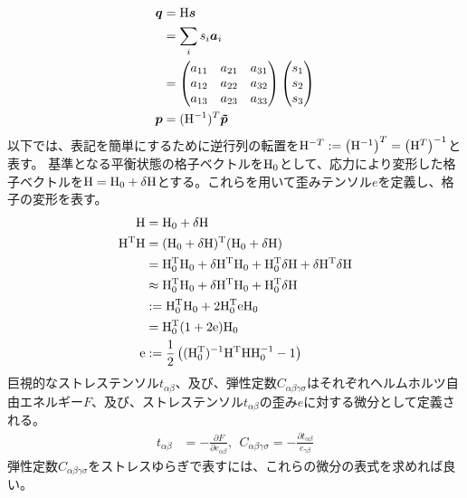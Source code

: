 \documentclass[11pt,a4paper,uplatex]{jsarticle}
\begin{document}
\begin{align}
    \bm{q} &= {\rm H} \bm{s} \\
    &= \sum_{i} s_{i} \bm{a}_{i} \\
    &=          \begin{pmatrix} 
        a_{11} & a_{21} & a_{31} \\
        a_{12} & a_{22} & a_{32} \\
        a_{13} & a_{23} & a_{33} \\
    \end{pmatrix} 
    \begin{pmatrix}
        s_{1} \\ s_{2} \\ s_{3} 
    \end{pmatrix} \\
    \bm{p} &= ({\rm H}^{-1})^{T} \bm{\tilde{p}} 
\end{align}  
以下では、表記を簡単にするために逆行列の転置を${\rm H}^{-T}:=\left({\rm H}^{-1}\right)^{T}=\left({\rm H}^{T}\right)^{-1}$と表す。
基準となる平衡状態の格子ベクトルを${\rm H}_{0}$として、応力により変形した格子ベクトルを${\rm H}={\rm H}_{0}+{\rm \delta H}$とする。これらを用いて歪みテンソル$e$を定義し、格子の変形を表す。
\begin{align}
    {\rm H} &= {\rm H_{0} + \delta H} \\
    {\rm H^{T} H} &= {\rm (H_{0} + \delta H)^{T} (H_{0} + \delta H)} \\
    &= {\rm H_{0}^{T} H_{0} + \delta H^{T} H_{0} + H_{0}^{T} \delta H + \delta H^{T} \delta H} \\
    &\approx {\rm H_{0}^{T} H_{0} + \delta H^{T} H_{0} + H_{0}^{T} \delta H } \\
    &:= {\rm H_{0}^{T} H_{0} + 2 H_{0}^{T} e H_{0}} \\
    &= {\rm H_{0}^T (1 + 2 e) H_{0}} \\
{\rm e} &:= {\rm \frac{1}{2}\left((H_{0}^{T})^{-1} H^{T} H H_{0}^{-1} - 1 \right) } \\
\end{align}
巨視的なストレステンソル$t_{\alpha \beta}$、及び、弾性定数$C_{\alpha \beta \gamma \sigma}$はそれぞれヘルムホルツ自由エネルギー$F$、及び、ストレステンソル$t_{\alpha \beta}$の歪み$e$に対する微分として定義される。
\begin{align}
 t_{\alpha \beta} &= -\frac{\partial F}{\partial e_{\alpha \beta}}, \ \
 C_{\alpha \beta \gamma \sigma} = -\frac{\partial t_{\alpha \beta}}{e_{\gamma \beta}}
\end{align}
弾性定数$C_{\alpha \beta \gamma \sigma}$をストレスゆらぎで表すには、これらの微分の表式を求めれば良い。
\end{document}
